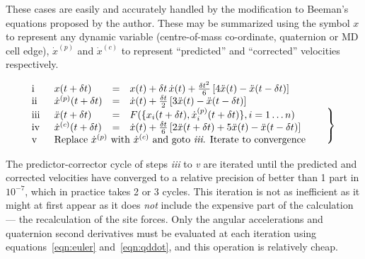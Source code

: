 \documentclass[a4paper,twoside]{report}
\begin{document}
These cases are easily and accurately handled by the modification to
Beeman's equations proposed by the author\cite{refson:85}.  These may
be summarized using the symbol $x$ to represent any dynamic variable
(centre-of-mass co-ordinate, quaternion or MD cell edge),
$\dot{x}^{(p)}$ and $\dot{x}^{(c)}$ to represent ``predicted'' and
``corrected'' velocities respectively.

\begin{equation}
  \begin{array}[c]{llcl}
    \textup{i} \quad & x(t+\delta t) &=& x(t) + \delta t \, \dot{x}(t) + 
    \frac{\delta t^2}{6} 
    \left [ 4 \ddot{x}(t) - \ddot{x}(t-\delta t) \right ] \\
    \textup{ii}  & \dot{x}^{(p)}(t+\delta t) & = & \dot{x}(t) + 
    \frac{\delta t}{2} \left [ 3 \ddot{x}(t)- \ddot{x}(t-\delta t) \right ]\\
    \textup{iii}  & \ddot{x}(t+\delta t) & = & F(\{ x_i(t+\delta t),
    \dot{x}_i^{(p)}(t+\delta t)\}, i =  1\ldots n) \\
    \textup{iv} & \dot{x}^{(c)}(t+\delta t) & = & \dot{x}(t) + \frac{\delta t}{6} 
    \left [ 2 \ddot{x}(t+\delta t) + 5 \ddot{x}(t)- \ddot{x}(t-\delta t) \right ]\\
    \textup{v} & \multicolumn{3}{l}{
      \textnormal{Replace $ \dot{x}^{(p)}$ with $\dot{x}^{(c)}$ and
    goto \emph{iii}.  Iterate to convergence}} 
  \end{array}
  \begin{array}[c]{l}
  \begin{array}{l}
    \strut\\
    \strut
  \end{array}\\
  \left .
  \begin{array}{l}
    \strut\\
    \strut\\
    \strut
  \end{array}
  \right \}
  \end{array}
  \label{eqn:beeman}
\end{equation}

The predictor-corrector cycle of steps \emph{iii} to \emph{v} are
iterated until the predicted and corrected velocities have converged
to a relative precision of better than 1 part in $10^{-7}$, which in
practice takes 2 or 3 cycles.  This iteration is not as inefficient as
it might at first appear as it does \emph{not} include the expensive
part of the calculation --- the recalculation of the site forces.
Only the angular accelerations and quaternion second derivatives must
be evaluated at each iteration using equations~\ref{eqn:euler} 
and~\ref{eqn:qddot}, and this operation is relatively cheap.
\end{document}
